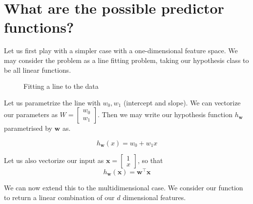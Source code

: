 \documentclass{report}
\newcommand{\tr}[1]{{{#1}^\top}} %
\newcommand{\w}{\mathbf{w}} %
\newcommand{\x}{\mathbf{x}}
\begin{document}
\section{What are the possible predictor functions?}

Let us first play with a simpler case with a one-dimensional feature space. We may consider the problem as a line fitting problem, taking our hypothesis class to be all linear functions.

\begin{figure}[H]
  \centering
  \caption{Fitting a line to the data}
\end{figure}

Let us parametrize the line with $w_0,w_1$ (intercept and slope). We can vectorize our parameters as $W = \begin{bmatrix} w_0 \\ w_1 \end{bmatrix}$. Then we may write our hypothesis function $h_\w$ parametrised by $\w$ as.

$$
  h_\w(x) = w_0 + w_1 x
$$

Let us also vectorize our input as $\x = \begin{bmatrix} 1 \\ x \end{bmatrix}$, so that
$$
  h_{\w}(\x) = \tr{\w} \x
$$

We can now extend this to the multidimensional case. We consider our function to return a linear combination of our \(d\) dimensional features. \newline
\end{document}
